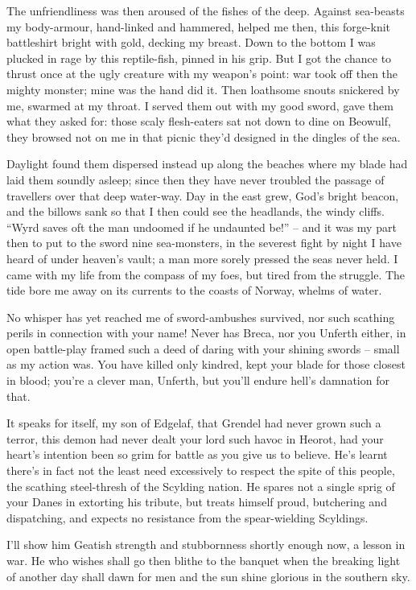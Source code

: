 \documentclass[a4paper]{article}
\begin{document}
{The unfriendliness was then aroused of the fishes of the deep.
Against sea-beasts my body-armour,
hand-linked and hammered, helped me then,
this forge-knit battleshirt bright with gold,
decking my breast. Down to the bottom
I was plucked in rage by this reptile-fish,
pinned in his grip. But I got the chance
to thrust once at the ugly creature
with my weapon’s point: war took off then
the mighty monster; mine was the hand did it.
Then loathsome snouts snickered by me,
swarmed at my throat. I served them out
with my good sword, gave them what they asked for:
those scaly flesh-eaters sat not down
to dine on Beowulf, they browsed not on me
in that picnic they’d designed in the dingles of the sea.

Daylight found them dispersed instead
up along the beaches where my blade had laid them
soundly asleep; since then they have never
troubled the passage of travellers over
that deep water-way. Day in the east grew,
God’s bright beacon, and the billows sank
so that I then could see the headlands,
the windy cliffs. “Wyrd saves oft
the man undoomed if he undaunted be!” –
and it was my part then to put to the sword
nine sea-monsters, in the severest fight
by night I have heard of under heaven’s vault;
a man more sorely pressed the seas never held.
I came with my life from the compass of my foes,
but tired from the struggle. The tide bore me
away on its currents to the coasts of Norway,
whelms of water.

No whisper has yet reached me
of sword-ambushes survived, nor such scathing perils
in connection with your name! Never has Breca,
nor you Unferth either, in open battle-play
framed such a deed of daring with your
shining swords – small as my action was.
You have killed only kindred, kept your blade
for those closest in blood; you’re a clever man, Unferth,
but you’ll endure hell’s damnation for that.

It speaks for itself, my son of Edgelaf,
that Grendel had never grown such a terror,
this demon had never dealt your lord
such havoc in Heorot, had your heart’s intention
been so grim for battle as you give us to believe.
He’s learnt there’s in fact not the least need
excessively to respect the spite of this people,
the scathing steel-thresh of the Scylding nation.
He spares not a single sprig of your Danes
in extorting his tribute, but treats himself proud,
butchering and dispatching, and expects no resistance
from the spear-wielding Scyldings.

I’ll show him Geatish
strength and stubbornness shortly enough now,
a lesson in war. He who wishes shall go then
blithe to the banquet when the breaking light
of another day shall dawn for men
and the sun shine glorious in the southern sky.

}
\end{document}
